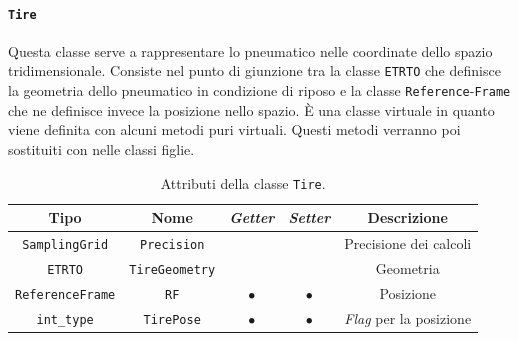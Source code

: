 \paragraph{\texttt{Tire}}
Questa classe serve a rappresentare lo pneumatico nelle coordinate dello spazio tridimensionale. Consiste nel punto di giunzione tra la classe \texttt{ETRTO} che definisce la geometria dello pneumatico in condizione di riposo e la classe \texttt{Reference}-\texttt{Frame} che ne definisce invece la posizione nello spazio. È una classe virtuale in quanto viene definita con alcuni metodi puri virtuali. Questi metodi verranno poi sostituiti con nelle classi figlie.
\begin{table}[h!]
	\centering
	\begin{tabular}{|c|c|c|c|c|}
		\hline 
		\textbf{Tipo} & \textbf{Nome} & \textit{\textbf{Getter}} & \textit{\textbf{Setter}} & \textbf{Descrizione} \\ \hline 
		\texttt{SamplingGrid} & \texttt{Precision} & & & Precisione dei calcoli \\ \hline 
		\texttt{ETRTO} & \texttt{TireGeometry} & & & Geometria \\ \hline 
		\texttt{ReferenceFrame} & \texttt{RF} & $\bullet$ & $\bullet$ & Posizione \\ \hline
		\texttt{int\_type} & \texttt{TirePose} & $\bullet$ & $\bullet$ & \textit{Flag} per la posizione \\ \hline
	\end{tabular}
	\caption{Attributi della classe \texttt{Tire}.}
	\label{}
\end{table}
%
